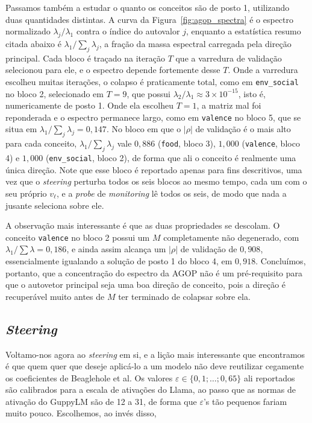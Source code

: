 Passamos também a estudar o quanto os conceitos são de posto 1, utilizando duas
quantidades distintas. A curva da Figura~\ref{fig:agop_spectra} é o espectro normalizado
$\lambda_j / \lambda_1$ contra o índice do autovalor $j$, enquanto a estatística resumo
citada abaixo é $\lambda_1 / \sum_j \lambda_j$, a fração da massa espectral carregada pela
direção principal. Cada bloco é traçado na iteração $T$ que a varredura de validação
selecionou para ele, e o espectro depende fortemente desse $T$. Onde a varredura escolheu
muitas iterações, o colapso é praticamente total, como em \verb|env_social| no bloco 2,
selecionado em $T = 9$, que possui $\lambda_2 / \lambda_1 \approx 3 \times 10^{-15}$, isto
é, numericamente de posto 1. Onde ela escolheu $T = 1$, a matriz mal foi reponderada e o
espectro permanece largo, como em \verb|valence| no bloco 5, que se situa em
$\lambda_1 / \sum_j \lambda_j = 0{,}147$. No bloco em que o $|\rho|$ de validação é o mais
alto para cada conceito, $\lambda_1 / \sum_j \lambda_j$ vale $0{,}886$ (\verb|food|, bloco
3), $1{,}000$ (\verb|valence|, bloco 4) e $1{,}000$ (\verb|env_social|, bloco 2), de forma que
ali o conceito é realmente uma única direção. Note que esse bloco é reportado apenas para
fins descritivos, uma vez que o \textit{steering} perturba todos os seis blocos ao mesmo
tempo, cada um com o seu próprio $v_\ell$, e a \textit{probe} de \textit{monitoring} lê todos os
seis, de modo que nada a jusante seleciona sobre ele.

A observação mais interessante é que as duas propriedades se descolam. O conceito
\verb|valence| no bloco 2 possui um $M$ completamente não degenerado, com
${\lambda_1}/{\sum \lambda} = 0{,}186$, e ainda assim alcança um $|\rho|$ de validação de
$0{,}908$, essencialmente igualando a solução de posto 1 do bloco 4, em $0{,}918$. Concluímos,
portanto, que a concentração do espectro da AGOP não é um pré-requisito para que o
autovetor principal seja uma boa direção de conceito, pois a direção é recuperável muito
antes de $M$ ter terminado de colapsar sobre ela.

\subsection{\textit{Steering}}

Voltamo-nos agora ao \textit{steering} em si, e a lição mais interessante que encontramos é
que quem quer que deseje aplicá-lo a um modelo não deve reutilizar cegamente os
coeficientes de Beaglehole et al. Os valores $\varepsilon \in \{0{,}1; \ldots; 0{,}65\}$ ali
reportados são calibrados para a escala de ativações do Llama, ao passo que as normas de
ativação do GuppyLM são de 12 a 31, de forma que $\varepsilon$'s tão pequenos fariam muito
pouco. Escolhemos, ao invés disso,

